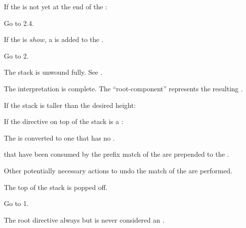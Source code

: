 \begin{step}
\begin{step}
\begin{step}
    \end{step}
  \item If the  is not yet at the end of the :
    \begin{step}
    \item Go to 2.4.
    \end{step}
  \item If the  is \inline$show$, a  is added to the .
  \item Go to 2.
  \end{step}
\item The stack is unwound fully. See .
\item The interpretation is complete. The ``root-component'' represents the resulting .
\end{step}

\begin{step}
\item If the stack is taller than the desired height:
  \begin{step}
  \item If the directive on top of the stack is a :
    \begin{step}
    \item The  is converted to one that has no .
    \item {} that have been consumed by the prefix match of the  are prepended to the .
    \item Other potentially necessary actions to undo the match of the  are performed.
    \end{step}
  \item The top of the stack is popped off.
  \item Go to 1.
  \end{step}
\end{step}

The root directive always  but is never considered an .

